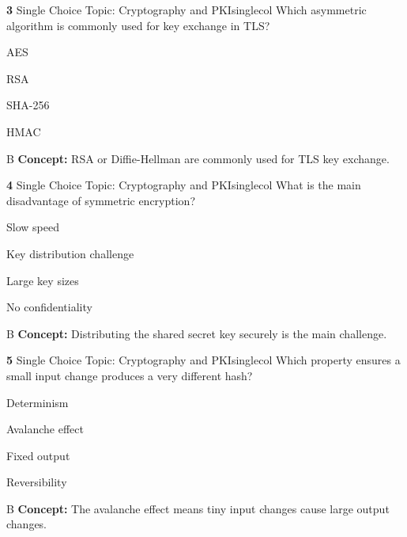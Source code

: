 \documentclass[10pt,a4paper]{article}
\begin{document}
\begin{qcard}{\color{white}\textbf{3} \hfill \small Single Choice \textbar{} Topic: Cryptography and PKI}{singlecol}
Which asymmetric algorithm is commonly used for key exchange in TLS?

\begin{qoptions}
\item AES
\item RSA
\item SHA-256
\item HMAC
\end{qoptions}
\begin{explainbox}{B}
\textbf{Concept:} RSA or Diffie-Hellman are commonly used for TLS key exchange.
\end{explainbox}
\end{qcard}

\begin{qcard}{\color{white}\textbf{4} \hfill \small Single Choice \textbar{} Topic: Cryptography and PKI}{singlecol}
What is the main disadvantage of symmetric encryption?

\begin{qoptions}
\item Slow speed
\item Key distribution challenge
\item Large key sizes
\item No confidentiality
\end{qoptions}
\begin{explainbox}{B}
\textbf{Concept:} Distributing the shared secret key securely is the main challenge.
\end{explainbox}
\end{qcard}

\begin{qcard}{\color{white}\textbf{5} \hfill \small Single Choice \textbar{} Topic: Cryptography and PKI}{singlecol}
Which property ensures a small input change produces a very different hash?

\begin{qoptions}
\item Determinism
\item Avalanche effect
\item Fixed output
\item Reversibility
\end{qoptions}
\begin{explainbox}{B}
\textbf{Concept:} The avalanche effect means tiny input changes cause large output changes.
\end{explainbox}
\end{qcard}
\end{document}
